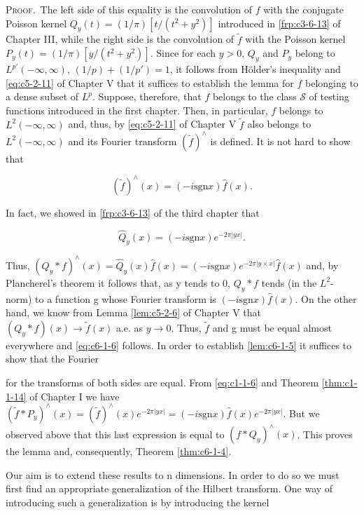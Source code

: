 \textsc{Proof.}\ The left side of this equality is the convolution of $f$ with the conjugate Poisson kernel $Q_y(t) = (1/\pi)[t/(t^2 + y^2)]$ introduced in \eqref{frp:c3-6-13} of Chapter III, while the right side is the convolution of $\tilde{f}$ with the Poisson kernel $P_y(t) = (1/\pi)[y/(t^2 + y^2)]$. Since for each $y > 0$, $Q_y$ and $P_y$ belong to $L^{p'}(-\infty, \infty)$, $(1/p) + (1/p') = 1$, it follows from Hölder's inequality and \eqref{eq:c5-2-11} of Chapter V that it suffices to establish the lemma for $f$ belonging to a dense subset of $L^p$. Suppose, therefore, that $f$ belongs to the class $\mathcal{S}$ of testing functions introduced in the first chapter. Then, in particular, $f$ belongs to $L^2(-\infty, \infty)$ and, thus, by \eqref{eq:c5-2-11} of Chapter V $\tilde{f}$ also belongs to $L^2(-\infty, \infty)$ and its Fourier transform $(\tilde{f})^\wedge$ is defined. It is not hard to show that

\begin{equation}\label{eq:c6-1-6}
(\tilde{f})^{\wedge}(x)=(-i\text{sgn}x)\hat{f}(x).
\end{equation}

In fact, we showed in \eqref{frp:c3-6-13} of the third chapter that

\[
\hat{Q}_{y}(x)=(-i\text{sgn}x)e^{-2\pi|y x|}.
\]

Thus, $(Q_y * f)^{\wedge}(x) = \hat{Q}_y(x) \hat{f}(x) = (-i \text{sgn} x) e^{-2\pi |y \times x|} \hat{f}(x)$ and, by Plancherel's theorem it follows that, as y tends to 0, $Q_y * f$ tends (in the $L^2$-norm) to a function g whose Fourier transform is $(-i \text{sgn} x) \hat{f}(x)$. On the other hand, we know from Lemma \ref{lem:c5-2-6} of Chapter V that $(Q_y * f)(x) \to \tilde{f}(x)$ a.e. as $y \to 0$. Thus, $\tilde{f}$ and g must be equal almost everywhere and \eqref{eq:c6-1-6} follows. In order to establish \eqref{lem:c6-1-5} it suffices to show that the Fourier

for the transforms of both sides are equal. From \eqref{eq:c1-1-6} and Theorem \ref{thm:c1-1-14} of Chapter I we have $(\tilde{f} * P_y)^{\wedge}(x) = (\tilde{f})^{\wedge}(x)e^{-2\pi|yx|} = (-i \text{sgn} x)\hat{f}(x)e^{-2\pi|yx|}$. But we observed above that this last expression is equal to $(f * Q_y)^{\wedge}(x)$. This proves the lemma and, consequently, Theorem \ref{thm:c6-1-4}.

Our aim is to extend these results to n dimensions. In order to do so we must first find an appropriate generalization of the Hilbert transform. One way of introducing such a generalization is by introducing the kernel

